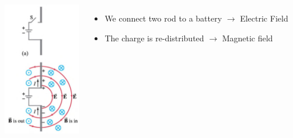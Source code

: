 \documentclass[]{beamer}
\begin{document}



\begin{frame}


   \begin{columns}[c]
   \column{2in}  %
  
  \begin{center}
  \includegraphics[height=2.3in]{images5/antenna1.jpg}
\end{center}


   \column{2.7in}


\begin{itemize}
\pause
\item We connect two rod to a battery $\rightarrow$ Electric Field 
\pause
\item  The charge is re-distributed $\rightarrow$  Magnetic field 

\end{itemize}

   \end{columns}


  \end{frame}


\end{document}
